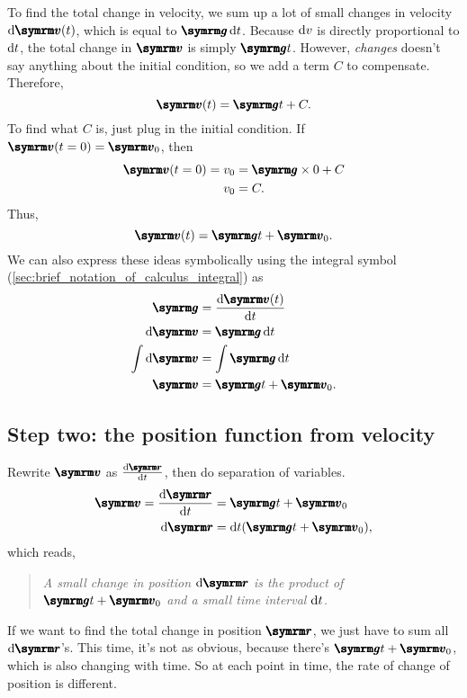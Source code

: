 \begin{multicols}{2}
To find the total change in velocity, we sum up a lot of small changes in velocity $\odif{\vv{v}}(t)$, which is equal to $\vv{g}\odif{t}$. Because $\odif{v}$ is directly proportional to $\odif{t}$, the total change in $\vv{v}$ is simply $\vv{g}t$. However, \emph{changes} doesn't say anything about the initial condition, so we add a term $C$ to compensate. Therefore,
\begin{equation}
    \vv{v}(t) = \vv{g}t + C.
\end{equation}
To find what $C$ is, just plug in the initial condition. If $\vv{v}(t = 0) = \vv{v}_0$, then
\begin{align}
    \vv{v}(t = 0) = v_0 &= \vv{g}\times 0 + C \\
    v_0 &= C.
\end{align}
Thus,
\begin{equation}
    \vv{v}(t) = \vv{g}t + \vv{v}_0.
\end{equation}
We can also express these ideas symbolically using the integral symbol (\cref{sec:brief_notation_of_calculus_integral}) as
\begin{align}
    \vv{g} &= \odv{\vv{v}(t)}{t} \\
    \odif{\vv{v}} &= \vv{g}\odif{t} \\
    \int\odif{\vv{v}} &= \int \vv{g}\odif{t} \\
    \vv{v} &= \vv{g}t + \vv{v}_0. \label{eq:simplemotionr}
\end{align}
\end{multicols}

\subsection{Step two: the position function from velocity}
Rewrite $\vv{v}$ as $\odv{\vv{r}}{t}$, then do separation of variables.
\begin{align}
    \vv{v} = \odv{\vv{r}}{t} &= \vv{g}t + \vv{v}_0 \label{eq:simplemotionr2} \\
    \odif{\vv{r}} &= \odif{t}(\vv{g}t + \vv{v}_0),\label{eq:simplemotionr3}
\end{align}
which reads,
\begin{quotation}
    \emph{A small change in position $\odif{\vv{r}}$ is the product of $\vv{g}t + \vv{v}_0$ and a small time interval $\odif{t}$.}
    \label{quote}
\end{quotation}
If we want to find the total change in position $\vv{r}$, we just have to sum all $\odif{\vv{r}}$'s. This time, it's not as obvious, because there's $\vv{g}t + \vv{v}_0$, which is also changing with time. So at each point in time, the rate of change of position is different.

